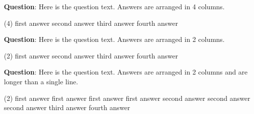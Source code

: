 \documentclass{article}
\begin{document}
\textbf{Question}: Here is the question text. Answers are arranged in 4 columns.
\begin{tasks}(4)
\task first answer
\task second answer
\task third answer
\task fourth answer
\end{tasks}

\bigskip

\textbf{Question}: Here is the question text. Answers are arranged in 2 columns.
\begin{tasks}(2)
\task first answer
\task second answer
\task third answer
\task fourth answer
\end{tasks}

\bigskip

\textbf{Question}: Here is the question text. Answers are arranged in 2 columns and are longer than a single line.
\begin{tasks}(2)
\task first answer first answer first answer first answer
\task second answer second answer second answer
\task third answer 
\task fourth answer
\end{tasks}
\end{document}
